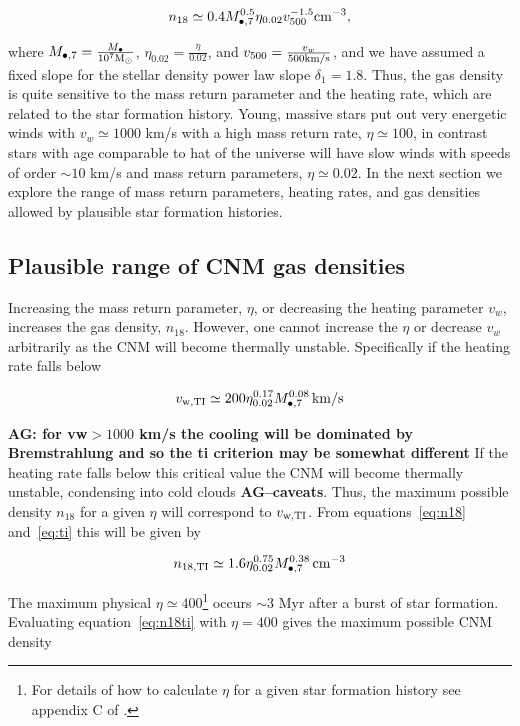 \documentclass[usenatbib,fleqn]{mn2e}
\newcommand{\Mbh}[1][]{M_{\bullet#1}}
\newcommand{\Msun}{{\rm M_\odot}}
\begin{document}
\begin{equation}
n_{18}\simeq 0.4 \Mbh[,7]^{0.5} \eta_{0.02} v_{500}^{-1.5} {\rm
  cm^{-3}},
\label{eq:n18}
\end{equation}

where $\Mbh[,7]=\frac{\Mbh}{10^7 \Msun}$,
$\eta_{0.02}=\frac{\eta}{0.02}$, and $v_{500}=\frac{v_w}{500 {\rm
    km/s}}$, and we have assumed a fixed slope for the stellar density
power law slope $\delta_1=1.8$. Thus, the gas density is quite
sensitive to the mass return parameter and the heating rate, which are
related to the star formation history. Young, massive stars put out
very energetic winds with $v_w\simeq 1000$ km/s with a high mass
return rate, $\eta\simeq 100$, in contrast stars with age comparable
to hat of the universe will have slow winds with speeds of order $\sim
10$ km/s and mass return parameters, $\eta\simeq0.02$. In the next
section we explore the range of mass return parameters, heating rates,
and gas densities allowed by plausible star formation histories.

\subsection{Plausible range of CNM gas densities}
Increasing the mass return parameter, $\eta$, or decreasing the
heating parameter $v_w$, increases the gas density, $n_{18}$.
However, one cannot increase the $\eta$ or decrease $v_w$ arbitrarily
as the CNM will become thermally unstable. Specifically if the heating
rate falls below

\begin{equation}
v_{\rm w,TI}\simeq 200 \eta_{0.02}^{0.17} \Mbh[,7]^{0.08} \,{\rm km/s} 
\label{eq:ti}
\end{equation}

{\bf AG: for vw$>1000$ km/s the cooling will be dominated by
  Bremstrahlung and so the ti criterion may be somewhat different} If
the heating rate falls below this critical value the CNM will become
thermally unstable, condensing into cold clouds {\bf
  AG--caveats}. Thus, the maximum possible density $n_{18}$ for a
given $\eta$ will correspond to $v_{\rm w,TI}$. From
equations~\eqref{eq:n18} and~\eqref{eq:ti} this will be given by

\begin{equation}
n_{\rm 18,TI}\simeq 1.6 \eta_{0.02}^{0.75} \Mbh[,7]^{0.38} \, {\rm cm^{-3}}
\label{eq:n18ti}
\end{equation}

The maximum physical $\eta\simeq 400$\footnote{For details
  of how to calculate $\eta$ for a given star formation history see
  appendix C of \citet{Generozov+2015}.} occurs $\sim 3$ Myr after a
burst of star formation. Evaluating equation~\eqref{eq:n18ti} with
$\eta=400$ gives the maximum possible CNM density
\end{document}
